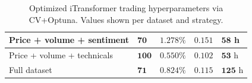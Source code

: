 \begin{table}[htbp]
\begin{minipage}[t]{0.7\textwidth}
\begin{tabular}{|p{3.4cm}|p{1.5cm}|p{1.6cm}|p{1.4cm}|p{1.2cm}|}
			\hline
				Price + volume + sentiment & $\mathbf{70}$ & $\mathbf{1.278\%}$ & $\mathbf{0.151}$ & $\mathbf{58}$ h \\
			\hline
				Price + volume + technicals & $\mathbf{100}$ & $\mathbf{0.550\%}$ & $\mathbf{0.102}$ & $\mathbf{53}$ h \\
			\hline
				Full dataset & $\mathbf{71}$ & $\mathbf{0.824\%}$ & $\mathbf{0.115}$ & $\mathbf{125}$ h \\
			\hline
			\end{tabular}
	\end{minipage}
	\caption{Optimized iTransformer trading hyperparameters via CV+Optuna. Values shown per dataset and strategy.}
	\label{tab:itransformer_hyperparams_summary}
\end{table}